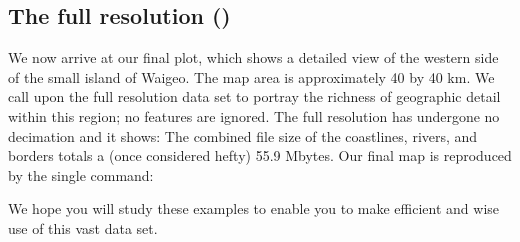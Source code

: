 
\subsection{The full resolution ()} 

We now arrive at our final plot, which shows a detailed view of
the western side of the small island of Waigeo.  The map area
is approximately 40 by 40 km.  We call upon the full resolution
data set to portray the richness of geographic detail within this
region; no features are ignored.  The full resolution has
undergone no decimation and it shows: The combined file size of
the coastlines, rivers, and borders totals a (once considered hefty) 55.9 Mbytes.
Our final map is reproduced by the single command:



We hope you will study these examples to enable you to make
efficient and wise use of this vast data set.
